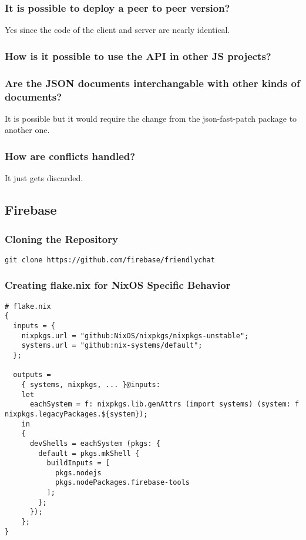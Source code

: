 \subsubsection{It is possible to deploy a peer to peer version?}
Yes since the code of the client and server are nearly identical.

\subsubsection{How is it possible to use the API in other JS projects?}

\subsubsection{Are the JSON documents interchangable with other kinds of documents?}
It is possible but it would require the change from the json-fast-patch package to another one.

\subsubsection{How are conflicts handled?}
It just gets discarded.

\subsection{Firebase}

\subsubsection{Cloning the Repository}
\begin{verbatim}
git clone https://github.com/firebase/friendlychat
\end{verbatim}

\subsubsection{Creating flake.nix for NixOS Specific Behavior}
\begin{verbatim}
# flake.nix
{
  inputs = {
    nixpkgs.url = "github:NixOS/nixpkgs/nixpkgs-unstable";
    systems.url = "github:nix-systems/default";
  };

  outputs =
    { systems, nixpkgs, ... }@inputs:
    let
      eachSystem = f: nixpkgs.lib.genAttrs (import systems) (system: f nixpkgs.legacyPackages.${system});
    in
    {
      devShells = eachSystem (pkgs: {
        default = pkgs.mkShell {
          buildInputs = [
            pkgs.nodejs
            pkgs.nodePackages.firebase-tools
          ];
        };
      });
    };
}
\end{verbatim}

